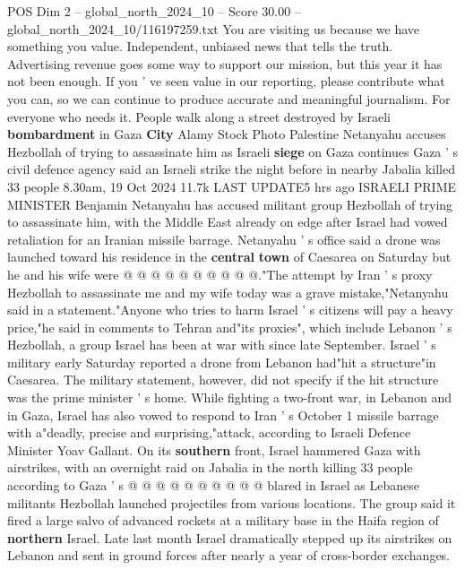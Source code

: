 \begin{textsample}{POS Dim 2 – global\_north\_2024\_10 – Score 30.00 – global\_north\_2024\_10/116197259.txt}  \label{ex:f2_pos_346}
You are visiting us because we have something you value.
Independent, unbiased news that tells the truth.
Advertising revenue goes some way to support our mission, but this year it has not been enough.
If you ' ve seen value in our reporting, please contribute what you can, so we can continue to produce accurate and meaningful journalism.
For everyone who needs it.
People walk along a street destroyed by Israeli \textbf{bombardment} in Gaza \textbf{City} Alamy Stock Photo Palestine Netanyahu accuses Hezbollah of trying to assassinate him as Israeli \textbf{siege} on Gaza continues Gaza ' s civil defence agency said an Israeli strike the night before in nearby Jabalia killed 33 people 8.30am, 19 Oct 2024 11.7k LAST UPDATE5 hrs ago ISRAELI PRIME MINISTER Benjamin Netanyahu has accused militant group Hezbollah of trying to assassinate him, with the Middle East already on edge after Israel had vowed retaliation for an Iranian missile barrage.
Netanyahu ' s office said a drone was launched toward his residence in the \textbf{central} \textbf{town} of Caesarea on Saturday but he and his wife were @ @ @ @ @ @ @ @ @ @."The attempt by Iran ' s proxy Hezbollah to assassinate me and my wife today was a grave mistake,"Netanyahu said in a statement."Anyone who tries to harm Israel ' s citizens will pay a heavy price,"he said in comments to Tehran and"its proxies", which include Lebanon ' s Hezbollah, a group Israel has been at war with since late September.
Israel ' s military early Saturday reported a drone from Lebanon had"hit a structure"in Caesarea.
The military statement, however, did not specify if the hit structure was the prime minister ' s home.
While fighting a two-front war, in Lebanon and in Gaza, Israel has also vowed to respond to Iran ' s October 1 missile barrage with a"deadly, precise and surprising,"attack, according to Israeli Defence Minister Yoav Gallant.
On its \textbf{southern} front, Israel hammered Gaza with airstrikes, with an overnight raid on Jabalia in the north killing 33 people according to Gaza ' s @ @ @ @ @ @ @ @ @ @ blared in Israel as Lebanese militants Hezbollah launched projectiles from various locations.
The group said it fired a large salvo of advanced rockets at a military base in the Haifa region of \textbf{northern} Israel.
Late last month Israel dramatically stepped up its airstrikes on Lebanon and sent in ground forces after nearly a year of cross-border exchanges.

\end{textsample}
